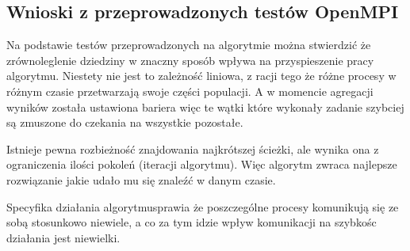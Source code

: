 \documentclass[10pt,a4paper]{article}
\begin{document}
\subsection{Wnioski z przeprowadzonych testów OpenMPI}

Na podstawie testów przeprowadzonych na algorytmie można stwierdzić że zrównoleglenie dziedziny w znaczny sposób wpływa na przyspieszenie pracy algorytmu.
Niestety nie jest to zależność liniowa, z racji tego że różne procesy w różnym czasie przetwarzają swoje części populacji. A w momencie agregacji wyników została ustawiona bariera więc te wątki które wykonały zadanie szybciej są zmuszone do czekania na wszystkie pozostałe.

Istnieje pewna rozbieżność znajdowania najkrótszej ścieżki, ale wynika ona z ograniczenia ilości pokoleń (iteracji algorytmu). Więc algorytm zwraca najlepsze rozwiązanie jakie udało mu się znaleźć w danym czasie.

 Specyfika działania algorytmusprawia że poszczególne procesy komunikują się ze sobą stosunkowo niewiele, a co za tym idzie wpływ komunikacji na szybkośc działania jest niewielki.
 
\end{document}
